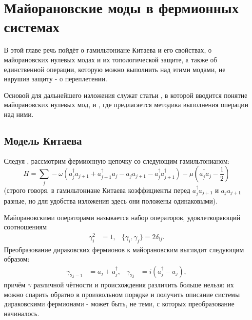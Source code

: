 \documentclass[a4paper,12pt]{article}
\theoremstyle{plain} %
\theoremstyle{definition} %
\theoremstyle{remark} %
\begin{document}

\pagebreak

\section{Майорановские моды в фермионных системах} \label{sec:majorana_modes}

В этой главе речь пойдёт о гамильтониане Китаева и его свойствах, о майорановских нулевых модах и их топологической защите, а также об единственной операции, которую можно выполнить над этими модами, не нарушив защиту - о переплетении.

Основой для дальнейшего изложения служат статьи \cite{kitaev}, в которой вводится понятие майорановских нулевых мод, и \cite{braiding}, где предлагается методика выполнения операции над ними. 

\subsection{Модель Китаева}
Следуя \cite{kitaev}, рассмотрим фермионную цепочку со следующим гамильтонианом:
\begin{equation}
    H = \sum\limits_j -\omega (a_j^\dagger a_{j+1} + a_{j+1}^\dagger a_j - a_j a_{j+1} - a_j^\dagger a_{j+1}^\dagger) - \mu \left( a_j^\dagger a_j - \frac{1}{2} \right)
\end{equation}
(строго говоря, в гамильтониане Китаева коэффициенты перед $a_j^\dagger a_{j+1}$ и $a_j a_{j+1}$ разные, но для удобства изложения здесь они положены одинаковыми).

Майорановскими операторами называется набор операторов, удовлетворяющий соотношениям
\begin{align}
\gamma_i^2 &= 1, & \{\gamma_i, \gamma_j\} = 2 \delta_{ij}.
\end{align}
Преобразование дираковских фермионов к майорановским выглядит следующим образом:
\begin{align}
\gamma_{2j-1} &= a_j + a_j^\dagger, & \gamma_{2j} &= i\left( a_j^\dagger - a_j \right),
\end{align}
причём $\gamma$ различной чётности и происхождения различить больше нельзя: их можно спарить обратно в произвольном порядке и получить описание системы дираковскими фермионами - может быть, не теми, с которых преобразование начиналось.
\end{document}
